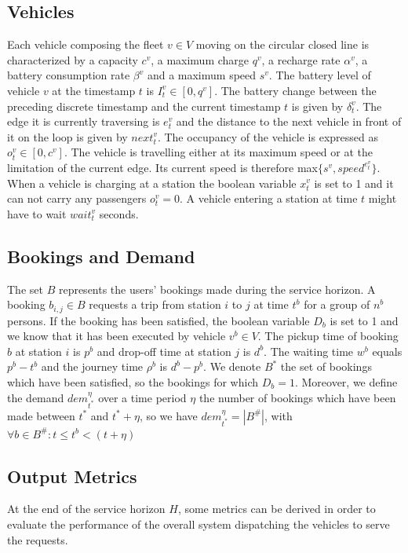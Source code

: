 \documentclass[12pt,a4paper]{article}
\begin{document}
\subsection{Vehicles}\label{vehicles}
Each vehicle composing the fleet $v \in V$ moving on the circular closed line is characterized by a capacity $c^{v}$, a maximum charge $q^{v}$, a recharge rate $\alpha^{v}$, a battery consumption rate $\beta^{v}$ and a maximum speed $s^{v}$. The battery level of vehicle $v$ at the timestamp $t$ is $I^{v}_{t} \in [0, q^{v}]$. The battery change between the preceding discrete timestamp and the current timestamp $t$ is given by $\delta^{v}_{t}$. The edge it is currently traversing is $e^{v}_{t}$ and the distance to the next vehicle in front of it on the loop is given by $next^{v}_{t}$. The occupancy of the vehicle is expressed as $o^{v}_{t} \in [0, c^{v}]$. The vehicle is travelling either at its maximum speed or at the limitation of the current edge. Its current speed is therefore max$\{s^{v}, speed^{e^{v}_{t}}\}$. When a vehicle is charging at a station the boolean variable $x^{v}_{t}$ is set to 1 and it can not carry any passengers $o^{v}_{t} = 0$. A vehicle entering a station at time $t$ might have to wait $wait^{v}_{t}$ seconds.

\subsection{Bookings and Demand}\label{bookings}
The set $B$ represents the users' bookings made during the service horizon. A booking $b_{i,j} \in B$ requests a trip from station $i$ to $j$ at time $t^{b}$ for a group of $n^{b}$ persons. If the booking has been satisfied, the boolean variable $D_{b}$ is set to 1 and we know that it has been executed by vehicle $v^{b} \in V$. The pickup time of booking $b$ at station $i$ is $p^{b}$ and drop-off time at station $j$ is $d^{b}$. The waiting time  $w^{b}$ equals $p^{b} - t^{b}$ and the journey time $\rho^{b}$ is $d^{b} - p^{b}$. We denote $B^{*}$ the set of bookings which have been satisfied, so the bookings for which $D_{b} = 1$. Moreover, we define the demand $dem_{t^{*}}^{\eta}$ over a time period $\eta$ the number of bookings which have been made between $t^{*}$ and $t^{*} + \eta$, so we have $dem_{t^{*}}^{\eta} = |B^{\#}|$, with $\forall b \in B^{\#}: t \leq t^{b} < (t+\eta)$

\subsection{Output Metrics}\label{metrics}
At the end of the service horizon $H$, some metrics can be derived in order to evaluate the performance of the overall system dispatching the vehicles to serve the requests. 
\end{document}

